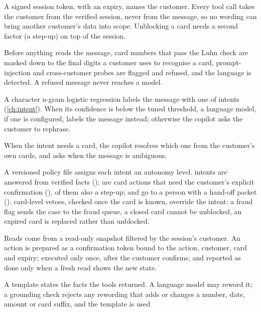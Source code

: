 \begin{description}[style=nextline]
  \item[Identity.] A signed session token, with an expiry, names the customer. Every tool call takes the customer
  from the verified session, never from the message, so no wording can bring another customer's data into scope.
  Unblocking a card needs a second factor (a step-up) on top of the session.
  \item[Gateway.] Before anything reads the message, card numbers that pass the Luhn check are masked down to the final
  digits a customer uses to recognise a card, prompt-injection and cross-customer probes are flagged and refused, and the language is detected.
  A refused message never reaches a model.
  \item[Intent model.] A character n-gram logistic regression labels the message with one of
   intents (\cref{ch:intent}). When its confidence is below the tuned threshold, a language
  model, if one is configured, labels the message instead; otherwise the copilot asks the customer to rephrase.
  \item[Card resolution.] When the intent needs a card, the copilot resolves which one from the customer's own
  cards, and asks when the message is ambiguous.
  \item[Policy.] A versioned policy file assigns each intent an autonomy level.  intents
  are answered from verified facts ();  are card actions that need the
  customer's explicit confirmation (),  of them also a step-up; and
   go to a person with a hand-off packet (). 
  card-level vetoes, checked once the card is known, override the intent: a fraud flag sends the case to the fraud
  queue, a closed card cannot be unblocked, an expired card is replaced rather than unblocked.
  \item[Tools.] Reads come from a read-only snapshot filtered by the session's customer. An action is prepared as a
  confirmation token bound to the action, customer, card and expiry; executed only once, after the customer
  confirms; and reported as done only when a fresh read shows the new state.
  \item[Reply.] A template states the facts the tools returned. A language model may reword it; a grounding check
  rejects any rewording that adds or changes a number, date, amount or card suffix, and the template is used

\end{description}
